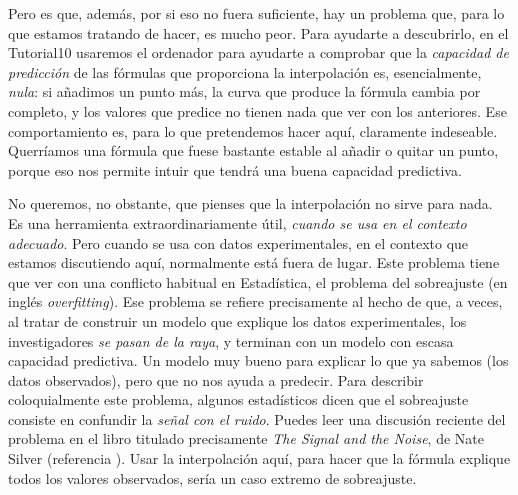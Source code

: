 Pero es que, además, por si eso no fuera suficiente, hay un problema que, para lo que estamos tratando de hacer, es mucho peor. Para ayudarte a descubrirlo, en el Tutorial10 usaremos el ordenador para ayudarte a
%
comprobar que la {\em capacidad de predicción} de las fórmulas que proporciona la interpolación es, esencialmente, {\em nula}: si  añadimos un punto más, la curva que produce la fórmula cambia por completo, y los  valores que predice no tienen nada que ver con los anteriores. Ese comportamiento es, para lo que pretendemos hacer aquí, claramente indeseable. Querríamos una fórmula que fuese bastante estable al añadir o quitar un punto, porque eso nos permite intuir que tendrá una buena capacidad predictiva.

No queremos, no obstante, que pienses que la interpolación no sirve para nada. Es una herramienta extraordinariamente útil, {\em cuando se usa en el contexto adecuado}. Pero cuando se usa con datos experimentales, en el contexto que estamos discutiendo aquí, normalmente está fuera de lugar. Este problema tiene que ver con una conflicto habitual en Estadística, el problema del {\sf sobreajuste} (en inglés {\em overfitting}). Ese problema se refiere precisamente al hecho de que, a veces, al tratar de construir un modelo que explique los datos experimentales, los investigadores {\em se pasan de la raya}, y terminan con un modelo con escasa capacidad predictiva. Un modelo muy bueno para explicar lo que ya sabemos (los datos observados), pero que no nos ayuda a predecir. Para describir coloquialmente este problema, algunos estadísticos dicen que el sobreajuste consiste en confundir la {\em señal con el ruido}. Puedes leer una discusión reciente del problema en el libro titulado precisamente {\em The Signal and the Noise}, de Nate Silver (referencia \cite{silver2012signal}). Usar la interpolación aquí, para hacer que la fórmula explique todos los valores observados, sería un caso extremo de sobreajuste.

